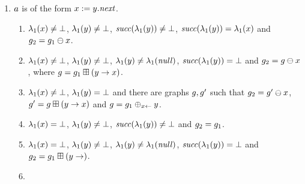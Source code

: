{\begin{enumerate}
\begin{enumerate}
\begin{enumerate}
    $\labeling_1(\xvar)\nequals\undef$, %
    $\labeling_1(\yvar)\nequals\undef$, %
    $\labeling_1(\xvar)\neq\labeling_1(\yvar)$ and $\graph_2=\graph_1$.
  \item \label{pre:case:notEqualsB}%
    $\labeling_1(\xvar)\neq\undef$, %
    $\labeling_1(\yvar)=\undef$ and %
    $\graph_2\in\graph_1\addNotEqVar{\xvar}{\yvar}$.
  \item \label{pre:case:notEqualsC}%
    $\labeling_1(\xvar)=\undef$, %
    $\labeling_1(\yvar)\neq\undef$ and %
    $\graph_2\in\graph_1\addNotEqVar{\yvar}{\xvar}$.
  \item \label{pre:case:notEqualsD}%
    $\labeling_1(\xvar)=\undef$, %
    $\labeling_1(\yvar)=\undef$ and %
    $\graph_2\in\graph\addNotEqVar{\xvar}{\yvar}$ for some
    $\graph\in\left(\graph_1\addVar{\xvar}\right)$.
  \end{enumerate}
\item $a$ is of the form $x:=y.{\it next}$.
%
  \begin{enumerate}
  \item \label{pre:case:assignedDotNextA}%
    $\labeling_1(\xvar)\neq\undef$, %
    $\labeling_1(\yvar)\neq\undef$, %
    ${\it succ}(\lambda_1(y))\neq\bot$, %
    ${\it succ}(\lambda_1(y))=\lambda_1(x)$ and
    $g_2=g_1\ominus{\ensuremath{x}}$.
  \item \label{pre:case:assignedDotNextB}%
    $\labeling_1(\xvar)\neq\undef$, %
    $\labeling_1(\yvar)\neq\undef$, %
    $\lambda_1(y)\neq\lambda_1({\it null})$, %
    ${\it succ}(\lambda_1(y))=\bot$ and
    $g_2=g\ominus{\ensuremath{x}}$, where
    $g=g_1\boxplus({y}\rightarrow{\ensuremath{x}})$.
  \item \label{pre:case:assignedDotNextC}%
    $\labeling_1(\xvar)\neq\undef$, %
    $\labeling_1(\yvar)=\undef$ %
    and there are graphs $g,g'$ such that
    $g_2=g'\ominus{\ensuremath{x}}$, %
    $g'=g\boxplus({y}\rightarrow{\ensuremath{x}})$ and %
    $g=g_1\oplus_{{x}\leftarrow}{y}$.
  \item \label{pre:case:assignedDotNextD}%
    $\labeling_1(\xvar)=\undef$, %
    $\labeling_1(\yvar)\neq\undef$, %
    ${\it succ}(\lambda_1(y))\neq\bot$ and %
    $\graph_2=\graph_1$.
  \item \label{pre:case:assignedDotNextE}%
    $\labeling_1(\xvar)=\undef$, %
    $\labeling_1(\yvar)\neq\undef$, %
    $\lambda_1(y)\neq\lambda_1({\it null})$, %
    ${\it succ}(\lambda_1(y))=\bot$ and %
    $g_2=g_1\boxplus({y}\rightarrow)$.
  \item \label{pre:case:assignedDotNextF}%

\end{enumerate}
\end{enumerate}
\end{enumerate}}
